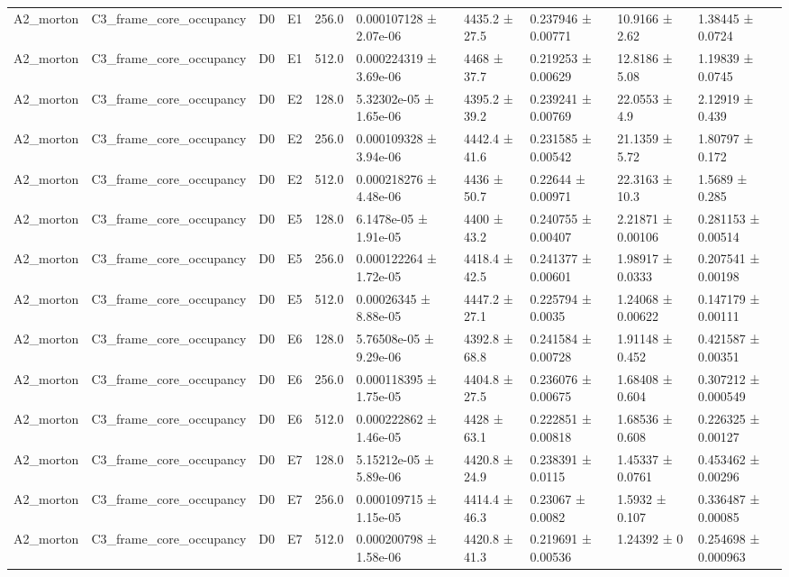 \begin{table}
\begin{tabular}{llllllllll}
A2\_morton & C3\_frame\_core\_occupancy & D0 & E1 & 256.0 & 0.000107128 ± 2.07e-06 & 4435.2 ± 27.5 & 0.237946 ± 0.00771 & 10.9166 ± 2.62 & 1.38445 ± 0.0724 \\
A2\_morton & C3\_frame\_core\_occupancy & D0 & E1 & 512.0 & 0.000224319 ± 3.69e-06 & 4468 ± 37.7 & 0.219253 ± 0.00629 & 12.8186 ± 5.08 & 1.19839 ± 0.0745 \\
A2\_morton & C3\_frame\_core\_occupancy & D0 & E2 & 128.0 & 5.32302e-05 ± 1.65e-06 & 4395.2 ± 39.2 & 0.239241 ± 0.00769 & 22.0553 ± 4.9 & 2.12919 ± 0.439 \\
A2\_morton & C3\_frame\_core\_occupancy & D0 & E2 & 256.0 & 0.000109328 ± 3.94e-06 & 4442.4 ± 41.6 & 0.231585 ± 0.00542 & 21.1359 ± 5.72 & 1.80797 ± 0.172 \\
A2\_morton & C3\_frame\_core\_occupancy & D0 & E2 & 512.0 & 0.000218276 ± 4.48e-06 & 4436 ± 50.7 & 0.22644 ± 0.00971 & 22.3163 ± 10.3 & 1.5689 ± 0.285 \\
A2\_morton & C3\_frame\_core\_occupancy & D0 & E5 & 128.0 & 6.1478e-05 ± 1.91e-05 & 4400 ± 43.2 & 0.240755 ± 0.00407 & 2.21871 ± 0.00106 & 0.281153 ± 0.00514 \\
A2\_morton & C3\_frame\_core\_occupancy & D0 & E5 & 256.0 & 0.000122264 ± 1.72e-05 & 4418.4 ± 42.5 & 0.241377 ± 0.00601 & 1.98917 ± 0.0333 & 0.207541 ± 0.00198 \\
A2\_morton & C3\_frame\_core\_occupancy & D0 & E5 & 512.0 & 0.00026345 ± 8.88e-05 & 4447.2 ± 27.1 & 0.225794 ± 0.0035 & 1.24068 ± 0.00622 & 0.147179 ± 0.00111 \\
A2\_morton & C3\_frame\_core\_occupancy & D0 & E6 & 128.0 & 5.76508e-05 ± 9.29e-06 & 4392.8 ± 68.8 & 0.241584 ± 0.00728 & 1.91148 ± 0.452 & 0.421587 ± 0.00351 \\
A2\_morton & C3\_frame\_core\_occupancy & D0 & E6 & 256.0 & 0.000118395 ± 1.75e-05 & 4404.8 ± 27.5 & 0.236076 ± 0.00675 & 1.68408 ± 0.604 & 0.307212 ± 0.000549 \\
A2\_morton & C3\_frame\_core\_occupancy & D0 & E6 & 512.0 & 0.000222862 ± 1.46e-05 & 4428 ± 63.1 & 0.222851 ± 0.00818 & 1.68536 ± 0.608 & 0.226325 ± 0.00127 \\
A2\_morton & C3\_frame\_core\_occupancy & D0 & E7 & 128.0 & 5.15212e-05 ± 5.89e-06 & 4420.8 ± 24.9 & 0.238391 ± 0.0115 & 1.45337 ± 0.0761 & 0.453462 ± 0.00296 \\
A2\_morton & C3\_frame\_core\_occupancy & D0 & E7 & 256.0 & 0.000109715 ± 1.15e-05 & 4414.4 ± 46.3 & 0.23067 ± 0.0082 & 1.5932 ± 0.107 & 0.336487 ± 0.00085 \\
A2\_morton & C3\_frame\_core\_occupancy & D0 & E7 & 512.0 & 0.000200798 ± 1.58e-06 & 4420.8 ± 41.3 & 0.219691 ± 0.00536 & 1.24392 ± 0 & 0.254698 ± 0.000963 \\

\end{tabular}
\end{table}
